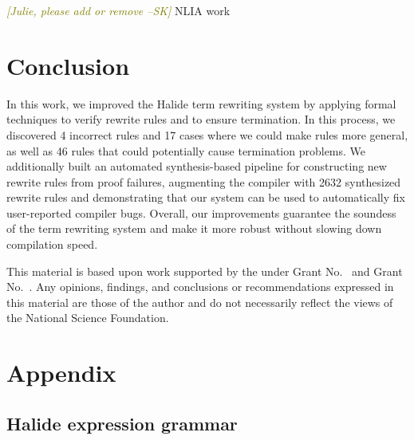 \documentclass[sigplan,10pt,review,anonymous]{acmart}\settopmatter{printfolios=true,printccs=false,printacmref=false}
\newcommand{\sak}[1]{\textcolor{olive}{\textit{[{#1} --SK]}}}
\newcommand{\NumRulesFixed}{{\color{red} 4}\xspace}
\newcommand{\NumPredicatesRelaxed}{{\color{red} 17}\xspace}
\newcommand{\NumOrderingProblems}{{\color{red} 46}\xspace}
\newcommand{\NumRulesSynthesized}{{\color{red} 2632}\xspace}
\begin{document}
\sak{Julie, please add or remove}
NLIA work~\cite{jovanovic2017solving}

\section{Conclusion}
In this work, we improved the Halide term rewriting system by applying formal
techniques to verify rewrite rules and to ensure termination.  In this process,
we discovered \NumRulesFixed incorrect rules and \NumPredicatesRelaxed cases
where we could make rules more general, as well as \NumOrderingProblems rules
that could potentially cause termination problems.  We additionally built
an automated synthesis-based pipeline for constructing new rewrite rules from
proof failures, augmenting the compiler with \NumRulesSynthesized synthesized
rewrite rules and demonstrating that our system can be used to automatically fix
user-reported compiler bugs. Overall, our improvements guarantee the soundess of the term rewriting system and make it more robust  without slowing down compilation speed.


\begin{acks}                            %
  This material is based upon work supported by the
   under Grant
  No.~ and Grant
  No.~.  Any opinions, findings, and
  conclusions or recommendations expressed in this material are those
  of the author and do not necessarily reflect the views of the
  National Science Foundation.
\end{acks}





\appendix
\section{Appendix}

\subsection{Halide expression grammar}
\label{ss:appendixA}
\end{document}
